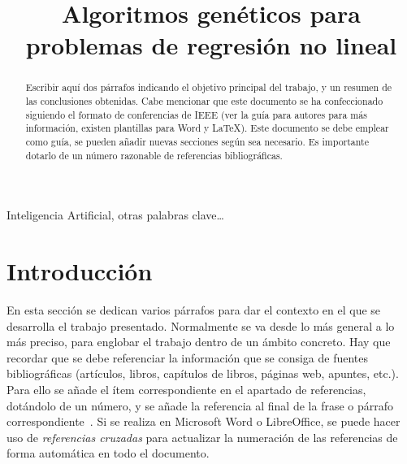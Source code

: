 \documentclass[conference,a4paper]{IEEEtran}
\begin{document}
\title{Algoritmos genéticos para problemas de regresión no lineal}

\author{
  
  \and
  
}

\maketitle


\begin{abstract}
  Escribir aquí dos párrafos indicando el objetivo principal del trabajo, y un
  resumen de las conclusiones obtenidas. Cabe mencionar que este documento se
  ha confeccionado siguiendo el formato de conferencias de IEEE (ver la guía
  para autores para más información, existen plantillas para Word y \LaTeX).
  Este documento se debe emplear como guía, se pueden añadir nuevas secciones
  según sea necesario. Es importante dotarlo de un número razonable de
  referencias bibliográficas.
\end{abstract}


\begin{IEEEkeywords}
  Inteligencia Artificial, otras palabras clave…
\end{IEEEkeywords}


\section{Introducción}

En esta sección se dedican varios párrafos para dar el contexto en el que se
desarrolla el trabajo presentado. Normalmente se va desde lo más general a lo
más preciso, para englobar el trabajo dentro de un ámbito concreto. Hay que
recordar que se debe referenciar la información que se consiga de fuentes
bibliográficas (artículos, libros, capítulos de libros, páginas web, apuntes,
etc.). Para ello se añade el ítem correspondiente en el apartado de
referencias, dotándolo de un número, y se añade la referencia al final de la
frase o párrafo correspondiente~\cite{b1}. Si se realiza en Microsoft Word o
LibreOffice, se puede hacer uso de \emph{referencias cruzadas} para actualizar
la numeración de las referencias de forma automática en todo el documento.
\end{document}
